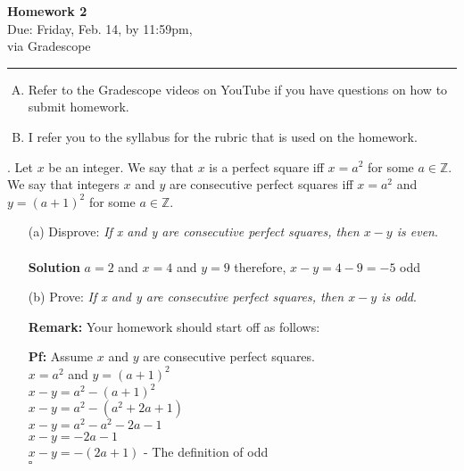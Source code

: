 \documentclass[12pt]{article}
\newif\ifshow
\begin{document}
\begin{center}
\ifshow
  \textbf{\Large Homework 0 Solution}\\
\else
  \textbf{\Large Homework 2}\\
\fi
Due: Friday, Feb. 14, by 11:59pm,\\via Gradescope\\
\end{center}

\hrule

\vspace{0.2cm}
\noindent
\begin{enumerate}[A.]
\item Refer to the Gradescope videos on YouTube if you have questions on how to submit homework.  
\item I refer you to the syllabus for the rubric that is used on the homework.  
\end{enumerate}

.  Let $x$ be an integer.  We say that $x$ is a perfect square iff $x = a^{2}$ for some $a \in \mathbb{Z}$.  We say that integers $x$ and $y$ are consecutive perfect squares iff $x= a^{2}$ and $y = (a + 1)^{2}$ for some $a \in \mathbb{Z}$.
\vspace{.05in}
\begin{enumerate}
    \item [(a)] Disprove: \textit{If x and y are consecutive perfect squares, then $x - y$ is even}. \\  \\
    \textbf{Solution} $a = 2$ and $x = 4$ and $y = 9$ therefore, $x - y = 4 - 9 = -5$ odd  
\item[(b)] Prove: \textit{If x and y are consecutive perfect squares, then $x - y$ is odd}.

\noindent \textbf{Remark:} Your homework should start off as follows:
\vspace{.05in}

\noindent \textbf {Pf:}  Assume $x$ and $y$ are consecutive perfect squares.\\
\indent $x = a^2$ and $y =(a+1)^2$ \\
\indent $x - y = a^2 - (a +1)^2$ \\
\indent $x - y = a^2 - (a^2 +2a +1)$ \\ 
\indent $ x - y = a^2 - a^2 - 2a -1$ \\ 
\indent $ x - y = -2a - 1$ \\
\indent $ x - y = - (2a+1)$ - The definition of odd\\
$\square$

\end{enumerate}
\vspace{.05in}
\end{document}

